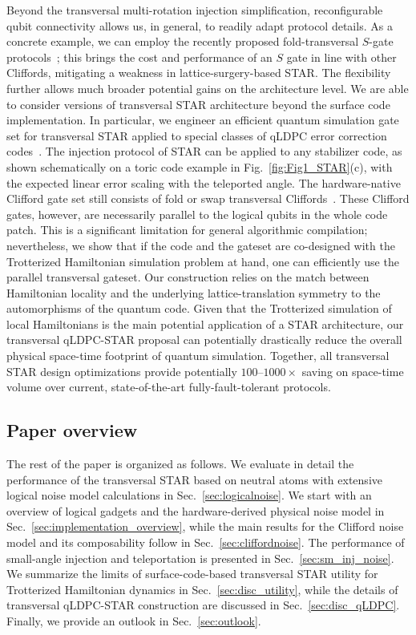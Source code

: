 \documentclass[aps, prx, reprint, superscriptaddress, longbibliography, floatfix]{revtex4-2}
\begin{document}
Beyond the transversal multi-rotation injection simplification, reconfigurable qubit connectivity allows us, in general, to readily adapt protocol details. As a concrete example, we can employ the recently proposed fold-transversal $S$-gate protocols~\cite{Chen2024}; this brings the cost and performance of an $S$ gate in line with other Cliffords, mitigating a weakness in lattice-surgery-based STAR. The flexibility further allows much broader potential gains on the architecture level. We are able to consider versions of transversal STAR architecture beyond the surface code implementation. In particular, we engineer an efficient quantum simulation gate set for transversal STAR applied to special classes of qLDPC error correction codes~\cite{Breuckmann2021, Bravyi2024, Xu2024, Kovalev2013}. The injection protocol of STAR can be applied to any stabilizer code, as shown schematically on a toric code example in Fig.~\ref{fig:Fig1_STAR}(c), with the expected linear error scaling with the teleported angle. The hardware-native Clifford gate set still consists of fold or swap transversal Cliffords~\cite{Breuckmann2024}. These Clifford gates, however, are necessarily parallel to the logical qubits in the whole code patch. This is a significant limitation for general algorithmic compilation; nevertheless, we show that if the code and the gateset are co-designed with the Trotterized Hamiltonian simulation problem at hand, one can efficiently use the parallel transversal gateset. Our construction relies on the match between Hamiltonian locality and the underlying lattice-translation symmetry to the automorphisms of the quantum code. Given that the Trotterized simulation of local Hamiltonians is the main potential application of a STAR architecture, our transversal qLDPC-STAR proposal can potentially drastically reduce the overall physical space-time footprint of quantum simulation. Together, all transversal STAR design optimizations provide potentially $100$--$1000\times$ saving on space-time volume over current, state-of-the-art fully-fault-tolerant protocols. 


\subsection{Paper overview}

The rest of the paper is organized as follows. We evaluate in detail the performance of the transversal STAR based on neutral atoms with extensive logical noise model calculations in Sec.~\ref{sec:logicalnoise}. We start with an overview of logical gadgets and the hardware-derived physical noise model in Sec.~\ref{sec:implementation_overview}, while the main results for the Clifford noise model and its composability follow in Sec.~\ref{sec:cliffordnoise}. The performance of small-angle injection and teleportation is presented in Sec.~\ref{sec:sm_inj_noise}. We summarize the limits of surface-code-based transversal STAR utility for Trotterized Hamiltonian dynamics in Sec.~\ref{sec:disc_utility}, while the details of transversal qLDPC-STAR construction are discussed in Sec.~\ref{sec:disc_qLDPC}. Finally, we provide an outlook in Sec.~\ref{sec:outlook}.
\end{document}
